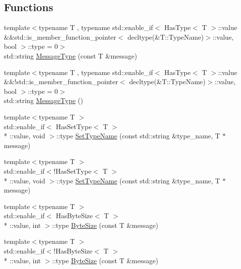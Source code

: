 \subsection*{Functions}
\begin{DoxyCompactItemize}
\item 
{\footnotesize template$<$typename T , typename std\-::enable\-\_\-if$<$ Has\-Type$<$ T $>$\-::value \&\&std\-::is\-\_\-member\-\_\-function\-\_\-pointer$<$ decltype(\&\-T\-::\-Type\-Name)$>$\-::value, bool $>$\-::type  = 0$>$ }\\std\-::string \hyperlink{namespaceapollo_1_1cyber_1_1message_aed7a0653ea8d7791da7cf676f507a8ba}{Message\-Type} (const T \&message)
\item 
{\footnotesize template$<$typename T , typename std\-::enable\-\_\-if$<$ Has\-Type$<$ T $>$\-::value \&\&!std\-::is\-\_\-member\-\_\-function\-\_\-pointer$<$ decltype(\&\-T\-::\-Type\-Name)$>$\-::value, bool $>$\-::type  = 0$>$ }\\std\-::string \hyperlink{namespaceapollo_1_1cyber_1_1message_a9804d294759658408491c5b8929e8cb5}{Message\-Type} ()
\item 
{\footnotesize template$<$typename T $>$ }\\std\-::enable\-\_\-if$<$ Has\-Set\-Type$<$ T $>$\\*
\-::value, void $>$\-::type \hyperlink{namespaceapollo_1_1cyber_1_1message_a2b337ed960f840af58dc36a9459a4865}{Set\-Type\-Name} (const std\-::string \&type\-\_\-name, T $\ast$message)
\item 
{\footnotesize template$<$typename T $>$ }\\std\-::enable\-\_\-if$<$!Has\-Set\-Type$<$ T $>$\\*
\-::value, void $>$\-::type \hyperlink{namespaceapollo_1_1cyber_1_1message_aa80d580cdaf16ade14c16309e336d42e}{Set\-Type\-Name} (const std\-::string \&type\-\_\-name, T $\ast$message)
\item 
{\footnotesize template$<$typename T $>$ }\\std\-::enable\-\_\-if$<$ Has\-Byte\-Size$<$ T $>$\\*
\-::value, int $>$\-::type \hyperlink{namespaceapollo_1_1cyber_1_1message_a86c5c50ba417237cb14b1bc0ef413e42}{Byte\-Size} (const T \&message)
\item 
{\footnotesize template$<$typename T $>$ }\\std\-::enable\-\_\-if$<$!Has\-Byte\-Size$<$ T $>$\\*
\-::value, int $>$\-::type \hyperlink{namespaceapollo_1_1cyber_1_1message_a53d094570369a6e8413967cdd4025b82}{Byte\-Size} (const T \&message)

\end{DoxyCompactItemize}
